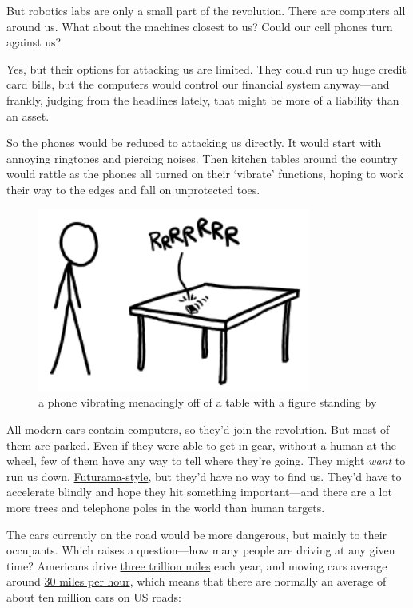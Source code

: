 {But robotics labs are only a small part of the revolution. There are computers all around us. What about the machines closest to us? Could our cell phones turn against us?}

{Yes, but their options for attacking us are limited. They could run up huge credit card bills, but the computers would control our financial system anyway—and frankly, judging from the headlines lately, that might be more of a liability than an asset.}

{So the phones would be reduced to attacking us directly. It would start with annoying ringtones and piercing noises. Then kitchen tables around the country would rattle as the phones all turned on their ‘vibrate’ functions, hoping to work their way to the edges and fall on unprotected toes.}

\begin{figure}[!htbp]
\centering
\includegraphics[scale=0.5, max width=0.8\textwidth]{imgs/a/5/robot_apocalypse_phone.png}
\caption{a phone vibrating menacingly off of a table with a figure standing by}
\end{figure}

{All modern cars contain computers, so they’d join the revolution. But most of them are parked. Even if they were able to get in gear, without a human at the wheel, few of them have any way to tell where they’re going. They might \emph{want} to run us down, \href{http://en.wikipedia.org/wiki/The\_Honking}{Futurama-style}, but they’d have no way to find us. They’d have to accelerate blindly and hope they hit something important—and there are a lot more trees and telephone poles in the world than human targets.}

{The cars currently on the road would be more dangerous, but mainly to their occupants. Which raises a question—how many people are driving at any given time? Americans drive \href{http://www.fhwa.dot.gov/policyinformation/travel\_monitoring/12maytvt/page2.cfm}{three trillion miles} each year, and moving cars average around \href{http://www.dieseltruckresource.com/dev/archive/average-mph-over-life-t118709.html} {30 miles per hour}, which means that there are normally an average of about ten million cars on US roads:}

